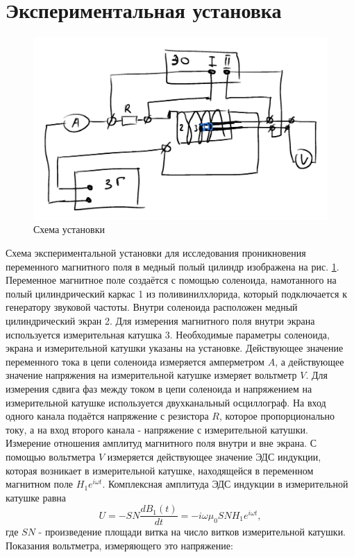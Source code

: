 \documentclass[a4paper, 12pt]{article}
\begin{document}
\section{Экспериментальная установка}
\begin{figure}[H]
    \centering
    \includegraphics[width=1\textwidth]{set}
    \caption{Схема установки}
    \label{fig:set}
\end{figure}
Схема экспериментальной установки для исследования проникновения переменного магнитного поля в медный полый цилиндр изображена на рис. \ref{fig:set}. Переменное магнитное поле создаётся с помощью соленоида, намотанного на полый цилиндрический каркас 1 из поливинилхлорида, который подключается к генератору звуковой частоты. Внутри соленоида расположен медный цилиндрический экран 2. Для измерения магнитного поля внутри экрана используется измерительная катушка 3. Необходимые параметры соленоида, экрана и измерительной катушки указаны на установке. Действующее значение переменного тока в цепи соленоида измеряется амперметром $A$, а действующее значение напряжения на измерительной катушке измеряет вольтметр $V$. Для измерения сдвига фаз между током в цепи соленоида и напряжением на измерительной катушке используется двухканальный осциллограф. На вход одного канала подаётся напряжение с резистора $R$, которое пропорционально току, а на вход второго канала - напряжение с измерительной катушки.
Измерение отношения амплитуд магнитного поля внутри и вне экрана. С помощью вольтметра $V$ измеряется действующее значение ЭДС индукции, которая возникает в измерительной катушке, находящейся в переменном магнитном поле $H_1 e^{i \omega t}$. Комплексная амплитуда
ЭДС индукции в измерительной катушке равна
$$
U=-S N \frac{d B_1(t)}{d t}=-i \omega \mu_0 S N H_1 e^{i \omega t},
$$
где $S N$ - произведение площади витка на число витков измерительной катушки. Показания вольтметра, измеряющего это напряжение:
\end{document}
